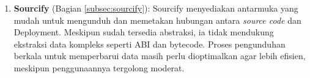 \begin{enumerate}
	\item \textbf{Sourcify} \parencite{sourcify_website} (Bagian \ref{subsec:sourcify}): Sourcify menyediakan antarmuka yang mudah untuk mengunduh dan memetakan hubungan antara \textit{source code} dan Deployment. Meskipun sudah tersedia abstraksi, ia tidak mendukung ekstraksi data kompleks seperti ABI dan bytecode. Proses pengunduhan berkala untuk memperbarui data masih perlu dioptimalkan agar lebih efisien, meskipun penggunaannya tergolong moderat.
\end{enumerate}

